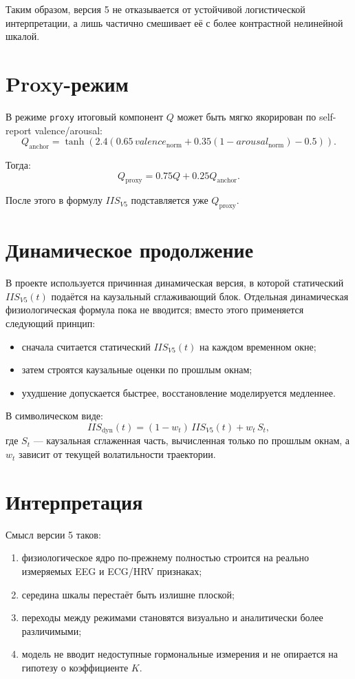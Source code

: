 \documentclass[12pt,a4paper]{article}
\begin{document}
Таким образом, версия 5 не отказывается от устойчивой логистической интерпретации, а лишь частично смешивает её с более контрастной нелинейной шкалой.

\section{Proxy-режим}
В режиме \texttt{proxy} итоговый компонент $Q$ может быть мягко якорирован по self-report valence/arousal:
\begin{equation}
Q_{\mathrm{anchor}}=
\tanh\!\left(
2.4\left(
0.65\,valence_{\mathrm{norm}}
+0.35(1-arousal_{\mathrm{norm}})
-0.5
\right)
\right).
\end{equation}

Тогда:
\begin{equation}
Q_{\mathrm{proxy}}=0.75Q+0.25Q_{\mathrm{anchor}}.
\end{equation}

После этого в формулу $IIS_{V5}$ подставляется уже $Q_{\mathrm{proxy}}$.

\section{Динамическое продолжение}
В проекте используется причинная динамическая версия, в которой статический $IIS_{V5}(t)$ подаётся на каузальный сглаживающий блок. Отдельная динамическая физиологическая формула пока не вводится; вместо этого применяется следующий принцип:
\begin{itemize}[leftmargin=1.25cm]
    \item сначала считается статический $IIS_{V5}(t)$ на каждом временном окне;
    \item затем строятся каузальные оценки по прошлым окнам;
    \item ухудшение допускается быстрее, восстановление моделируется медленнее.
\end{itemize}

В символическом виде:
\begin{equation}
IIS_{\mathrm{dyn}}(t)=(1-w_t)\,IIS_{V5}(t)+w_t\,S_t,
\end{equation}
где $S_t$ --- каузальная сглаженная часть, вычисленная только по прошлым окнам, а $w_t$ зависит от текущей волатильности траектории.

\section{Интерпретация}
Смысл версии 5 таков:
\begin{enumerate}[leftmargin=1.25cm]
    \item физиологическое ядро по-прежнему полностью строится на реально измеряемых EEG и ECG/HRV признаках;
    \item середина шкалы перестаёт быть излишне плоской;
    \item переходы между режимами становятся визуально и аналитически более различимыми;
    \item модель не вводит недоступные гормональные измерения и не опирается на гипотезу о коэффициенте $K$.
\end{enumerate}
\end{document}
